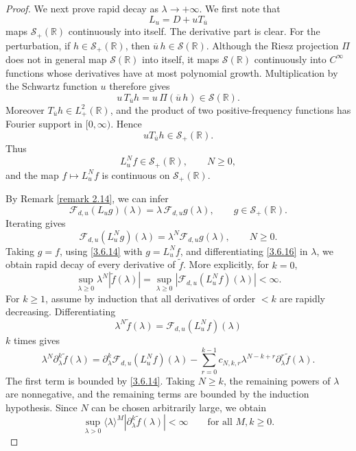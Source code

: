 \documentclass[10pt]{article}
\numberwithin{equation}{section}
\numberwithin{theorem}{section}
\begin{document}
\begin{proof}
We next prove rapid decay as \(\lambda\to+\infty\). We first note that
\[
L_u=D+uT_{\overline u}
\]
maps \(\mathcal S_+(\mathbb R)\) continuously into itself. The derivative part is clear.
For the perturbation, if \(h\in\mathcal S_+(\mathbb R)\), then
\(\overline u\,h\in\mathcal S(\mathbb R)\). Although the Riesz projection \(\Pi\) does
not in general map \(\mathcal S(\mathbb R)\) into itself, it maps
\(\mathcal S(\mathbb R)\) continuously into \(C^\infty\) functions whose derivatives have
at most polynomial growth. Multiplication by the Schwartz function \(u\) therefore gives
\[
u\,T_{\overline u}h
=
u\,\Pi(\overline u\,h)
\in\mathcal S(\mathbb R).
\]
Moreover \(T_{\overline u}h\in L^2_+(\mathbb R)\), and the product of two positive-frequency
functions has Fourier support in \([0,\infty)\). Hence
\[
uT_{\overline u}h\in\mathcal S_+(\mathbb R).
\]
Thus
\begin{equation}
\label{3.6.15}
L_u^Nf\in\mathcal S_+(\mathbb R),
\qquad N\ge0,
\end{equation}
and the map \(f\mapsto L_u^Nf\) is continuous on \(\mathcal S_+(\mathbb R)\).

By Remark \ref{remark 2.14}, we can infer
\[
\mathcal F_{d,u}(L_ug)(\lambda)=\lambda\,\mathcal F_{d,u}g(\lambda),
\qquad g\in\mathcal S_+(\mathbb R).
\]
Iterating gives
\begin{equation}
\label{3.6.16}
\mathcal F_{d,u}(L_u^Ng)(\lambda)=\lambda^N\mathcal F_{d,u}g(\lambda),
\qquad N\ge0.
\end{equation}
Taking \(g=f\), using \eqref{3.6.14} with \(g=L_u^Nf\), and differentiating
\eqref{3.6.16} in \(\lambda\), we obtain rapid decay of every derivative of
\(\widetilde f\). More explicitly, for \(k=0\),
\[
\sup_{\lambda\ge0}
\lambda^N|\widetilde f(\lambda)|
=
\sup_{\lambda\ge0}
|\mathcal F_{d,u}(L_u^Nf)(\lambda)|
<\infty .
\]
For \(k\ge1\), assume by induction that all derivatives of order \(<k\) are rapidly
decreasing. Differentiating
\[
\lambda^N\widetilde f(\lambda)=\mathcal F_{d,u}(L_u^Nf)(\lambda)
\]
\(k\) times gives
\[
\lambda^N\partial_\lambda^k\widetilde f(\lambda)
=
\partial_\lambda^k\mathcal F_{d,u}(L_u^Nf)(\lambda)
-
\sum_{r=0}^{k-1}
c_{N,k,r}\lambda^{N-k+r}\partial_\lambda^r\widetilde f(\lambda).
\]
The first term is bounded by \eqref{3.6.14}. Taking \(N\ge k\), the remaining powers of
\(\lambda\) are nonnegative, and the remaining terms are bounded by the induction
hypothesis. Since \(N\) can be chosen arbitrarily large, we obtain
\begin{equation}
\label{3.6.17}
\sup_{\lambda>0}
\langle\lambda\rangle^M
|\partial_\lambda^k\widetilde f(\lambda)|
<\infty
\qquad\text{for all }M,k\ge0.
\end{equation}


\end{proof}
\end{document}
